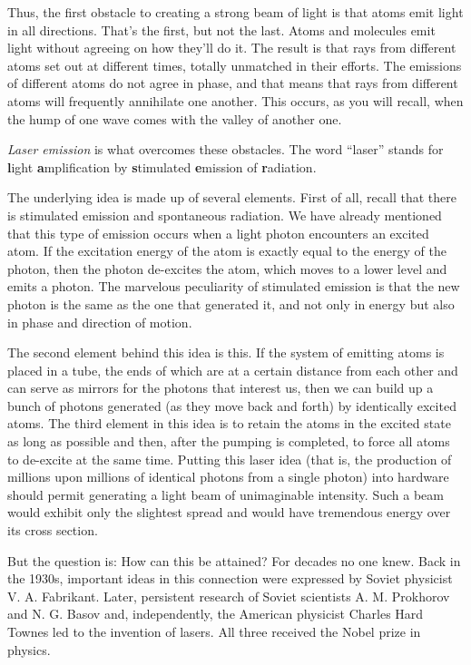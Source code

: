 Thus, the first obstacle to creating a strong beam of light is that atoms emit light in all directions. That’s the first, but not the last. Atoms and molecules emit light without agreeing on how they’ll do it. The result is that rays from different atoms set out at different times, totally unmatched in their efforts. The emissions of different atoms do not agree in phase, and that means that rays from different atoms will frequently annihilate one another. This occurs, as you will recall, when the hump of one wave comes with the valley of another one.

\emph{Laser emission} is what overcomes these obstacles. The word ``laser'' stands for \textbf{l}ight \textbf{a}mplification by \textbf{s}timulated \textbf{e}mission of \textbf{r}adiation.

The underlying idea is made up of several elements. First of all, recall that there is stimulated emission and spontaneous radiation. We have already mentioned that this type of emission occurs when a light photon encounters an excited atom. If the excitation energy of the atom is exactly equal to the energy of the photon, then the photon de-excites the atom, which moves to a lower level and emits a photon. The marvelous peculiarity of stimulated emission is that the new photon is the same as the one that generated it, and not only in energy but also in phase and direction of motion.

The second element behind this idea is this. If the system of emitting atoms is placed in a tube, the ends of which are at a certain distance from each other and can serve as mirrors for the photons that interest us, then we can build up a bunch of photons generated (as they move back and forth) by identically excited atoms.
The third element in this idea is to retain the atoms in the excited state as long as possible and then, after the pumping is completed, to force all atoms to de-excite at the same time. Putting this laser idea (that is, the production of millions upon millions of identical photons from a single photon) into hardware should permit generating a light beam of unimaginable intensity. Such a beam would exhibit only the slightest spread and would have tremendous energy over its cross section.

But the question is: How can this be attained? For decades no one knew. Back in the 1930s, important ideas in this connection were expressed by Soviet physicist V. A. Fabrikant. Later, persistent research of Soviet scientists A. M. Prokhorov and N. G. Basov and, independently, the American physicist Charles Hard Townes led to the invention of lasers. All three received the Nobel prize in physics.

